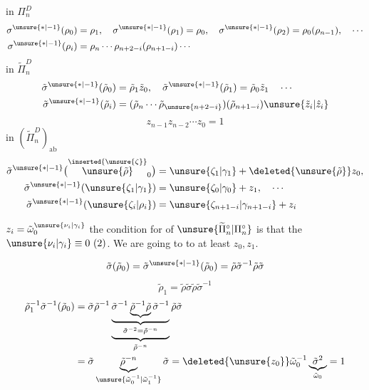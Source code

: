in $\Pi_n^D$
\[
\begin{aligned}
\sigma^{\unsure{\ast|-1}}(\rho_0)&=\rho_1,\quad
\sigma^{\unsure{\ast|-1}}(\rho_1)=\rho_0,\quad
\sigma^{\unsure{\ast|-1}}(\rho_2)=\rho_0(\rho_{n-1}),\quad\cdots\\
\sigma^{\unsure{\ast|-1}}(\rho_i)&=\rho_n\cdots\rho_{n+2-i}(\rho_{n+1-i})\cdots
\end{aligned}
\]
in $\widetilde\Pi_n^D$
\[
\begin{aligned}
\tilde\sigma^{\unsure{\ast|-1}}(\tilde\rho_0)&=\tilde\rho_1\tilde z_0,\quad
\tilde\sigma^{\unsure{\ast|-1}}(\tilde\rho_1)=\tilde\rho_0\tilde z_1\quad\cdots\\
\tilde\sigma^{\unsure{\ast|-1}}(\tilde\rho_i)&=
(\tilde\rho_n\cdots\tilde\rho_{\unsure{n+2-i}})(\tilde\rho_{n+1-i})\unsure{\tilde z_i|\hat z_i}
\end{aligned}
\]
\[
z_{n-1}z_{n-2}\cdots z_0=1
\]
in $(\widetilde\Pi_n^D)_{\mathrm{ab}}$
\[
\begin{aligned}
\tilde\sigma^{\unsure{\ast|-1}}
\bigl(\overset{\inserted{\unsure{\zeta}}}{\unsure{\tilde\rho}}_0\bigr)
&=\unsure{\zeta_1|\gamma_1}+\deleted{\unsure{\tilde\rho}}z_0,\\
\tilde\sigma^{\unsure{\ast|-1}}(\unsure{\zeta_1|\gamma_1})
&=\unsure{\zeta_0|\gamma_0}+z_1,\quad\cdots\\
\tilde\sigma^{\unsure{\ast|-1}}(\unsure{\zeta_i|\rho_i})
&=\unsure{\zeta_{n+1-i}|\gamma_{n+1-i}}+z_i
\end{aligned}
\]

$z_i=\tilde\omega_0^{\unsure{\nu_i|\gamma_i}}$
the condition for  of $\unsure{\widetilde\Pi_n^\circ|\Pi_n^\circ}$ is
that the $\unsure{\nu_i|\gamma_i}\equiv0\ (2)$.
We are going to  to   at least $z_0,z_1$.

\[
\tilde\sigma(\tilde\rho_0)
=\tilde\sigma^{\unsure{\ast|-1}}(\tilde\rho_0)
=\tilde\rho\tilde\sigma^{-1}\tilde\rho\tilde\sigma
\]
\[
\tilde\rho_1=\tilde\rho\tilde\sigma\tilde\rho\tilde\sigma^{-1}
\]
\[
\begin{aligned}
\tilde\rho_1^{-1}\tilde\sigma^{-1}(\tilde\rho_0)
&=\tilde\sigma\tilde\rho^{-1}
\underbrace{\underbrace{\tilde\sigma^{-1}
\underbrace{\tilde\rho^{-1}\tilde\rho}\tilde\sigma^{-1}}_{
\tilde\sigma^{-2}=\tilde\rho^{-n}}}_{\tilde\rho^{-n}}
\tilde\rho\tilde\sigma\\
&=\tilde\sigma\underbrace{\tilde\rho^{-n}}_{
\unsure{\tilde\omega_0^{-1}|\tilde\omega_1^{-1}}}\tilde\sigma
=\deleted{\unsure{z_0}}\tilde\omega_0^{-1}\underbrace{\tilde\sigma^2}_{\tilde\omega_0}=1
\end{aligned}
\]
\margin{\deleted{$\unsure{\tilde\rho}$}}

